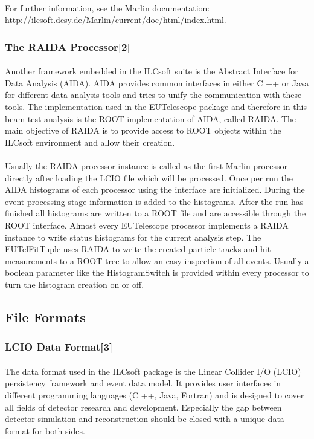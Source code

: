 \documentclass[11pt]{article}
\begin{document}
\paragraph{}
For further information, see the Marlin documentation: \url{http://ilcsoft.desy.de/Marlin/current/doc/html/index.html}.
\subsubsection{The RAIDA Processor[2]}
\paragraph{}
Another framework embedded in the ILCsoft suite is the Abstract Interface for Data Analysis (AIDA). AIDA provides common interfaces in either C ++ or Java for different data analysis tools and tries to unify the communication with these tools. The implementation used in the EUTelescope package and therefore in this beam test analysis is the ROOT implementation of AIDA, called RAIDA. The main objective of RAIDA is to provide access to ROOT objects within the ILCsoft environment and allow their creation.
\paragraph{}
Usually the RAIDA processor instance is called as the first Marlin processor directly after loading the LCIO file which will be processed. Once per run the AIDA histograms of each processor using the interface are initialized. During the event processing stage information is added to the histograms. After the run has finished all histograms are written to a ROOT file and are accessible through the ROOT interface. Almost every EUTelescope processor implements a RAIDA instance to write status histograms for the current analysis step. The EUTelFitTuple uses RAIDA to write the created particle tracks and hit measurements to a ROOT tree to allow an easy inspection of all events. Usually a boolean parameter like the HistogramSwitch is provided within every processor to turn the histogram creation on or off.
\subsection{File Formats}
\subsubsection{LCIO Data Format[3]}
\paragraph{}
The data format used in the ILCsoft package is the Linear Collider I/O (LCIO) persistency framework and event data model. It provides user interfaces in different programming languages (C ++, Java, Fortran) and is designed to cover all fields of detector research and development. Especially the gap between detector simulation and reconstruction should be closed with a unique data format for both sides.
\end{document}
